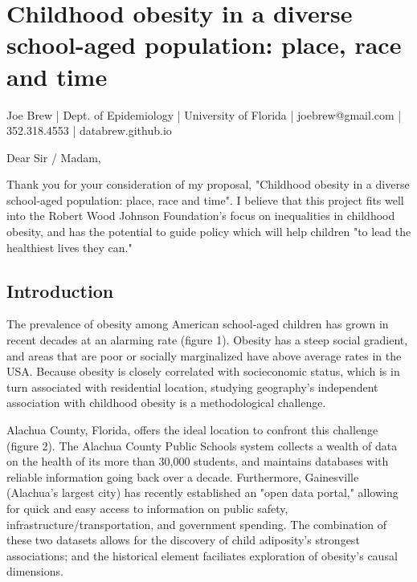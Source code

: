 \documentclass[11pt]{article}
\begin{document}


\fancyhfoffset[E,O]{0pt}

\section*{Childhood obesity in a diverse school-aged population: place, race and time}
Joe Brew | Dept. of Epidemiology | University of Florida | joebrew@gmail.com | 352.318.4553 | databrew.github.io

\noindent \hrulefill

\vspace{5mm}
\noindent Dear Sir / Madam,

Thank you for your consideration of my proposal, "Childhood obesity in a diverse school-aged population: place, race and time".  I believe that this project fits well into the Robert Wood Johnson Foundation's focus on inequalities in childhood obesity, and has the potential to guide policy which will help children "to lead the healthiest lives they can."  


\subsection*{Introduction}
The prevalence of obesity among American school-aged children has grown in recent decades at an alarming rate (figure 1)\cite{Ogden2014}. Obesity has a steep social gradient, and areas that are poor or socially marginalized have above average rates in the USA.\cite{Budd2014} Because obesity is closely correlated with socieconomic status, which is in turn associated with residential location, studying geography's independent association with childhood obesity is a methodological challenge. 

Alachua County, Florida, offers the ideal location to confront this challenge (figure 2).  The Alachua County Public Schools system\cite{acps} collects a wealth of data on the health of its more than 30,000 students, and maintains databases with reliable information going back over a decade.  Furthermore, Gainesville (Alachua's largest city) has recently established an "open data portal," allowing for quick and easy access to information on public safety, infrastructure/transportation, and government spending.\cite{gnv}  The combination of these two datasets allows for the discovery of child adiposity's strongest associations; and the historical element faciliates exploration of obesity's causal dimensions.
\end{document}
